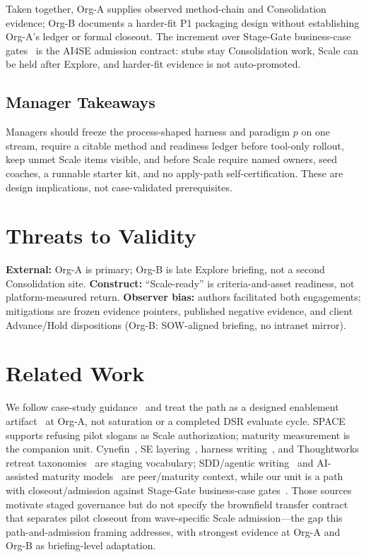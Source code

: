\documentclass[10pt,conference]{IEEEtran}
\begin{document}
Taken together, Org-A supplies observed method-chain and Consolidation evidence;
Org-B documents a harder-fit P1 packaging design without establishing Org-A's
ledger or formal closeout.
The increment over Stage-Gate business-case gates~\cite{Cooper1990StageGate} is
the AI4SE admission contract: stubs stay Consolidation work, Scale can be held
after Explore, and harder-fit evidence is not auto-promoted.

\subsection{Manager Takeaways}

Managers should freeze the process-shaped harness and paradigm \(p\) on one
stream, require a citable method and readiness ledger before tool-only rollout,
keep unmet Scale items visible, and before Scale require named owners, seed
coaches, a runnable starter kit, and no apply-path self-certification.
These are design implications, not case-validated prerequisites.

\section{Threats to Validity}
\label{sec:threats}

\textbf{External:} Org-A is primary; Org-B is late Explore briefing, not a
second Consolidation site.
\textbf{Construct:} ``Scale-ready'' is criteria-and-asset readiness, not
platform-measured return.
\textbf{Observer bias:} authors facilitated both engagements; mitigations are
frozen evidence pointers, published negative evidence, and client Advance/Hold
dispositions (Org-B: SOW-aligned briefing, no intranet mirror).

\section{Related Work}
\label{sec:related-work}

We follow case-study guidance~\cite{Runeson2009CaseStudy} and treat the path as
a designed enablement artifact~\cite{Hevner2004DSR} at Org-A, not saturation
or a completed DSR evaluate cycle. SPACE~\cite{Forsgren2021SPACE} supports
refusing pilot slogans as Scale authorization; maturity measurement is the
companion unit.
Cynefin~\cite{Snowden2007Cynefin}, SE layering~\cite{Pressman2014SEPA},
harness writing~\cite{Boeckeler2026Harness}, and Thoughtworks retreat
taxonomies~\cite{Thoughtworks2026UtahRetreat,Thoughtworks2026EuropeRetreat}
are staging vocabulary; SDD/agentic writing~\cite{Gupta2026SDDAgentic} and
AI-assisted maturity models~\cite{Tereci2026AASD} are peer/maturity context,
while our unit is a path with closeout/admission against Stage-Gate
business-case gates~\cite{Cooper1990StageGate}.
Those sources motivate staged governance but do not specify the brownfield
transfer contract that separates pilot closeout from wave-specific Scale
admission---the gap this path-and-admission framing addresses, with strongest
evidence at Org-A and Org-B as briefing-level adaptation.
\end{document}
